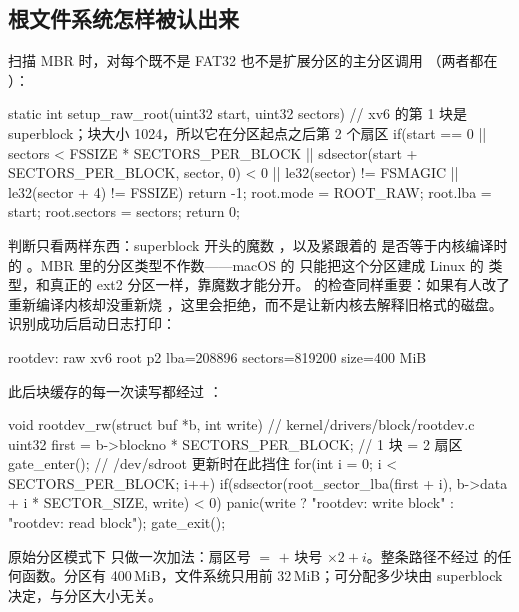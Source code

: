 \subsection{根文件系统怎样被认出来}

 扫描 MBR 时，对每个既不是 FAT32 也不是扩展分区的主分区调用 （两者都在 ）：

\begin{ccode}
static int setup_raw_root(uint32 start, uint32 sectors) {
  // xv6 的第 1 块是 superblock；块大小 1024，所以它在分区起点之后第 2 个扇区
  if(start == 0 || sectors < FSSIZE * SECTORS_PER_BLOCK ||
     sdsector(start + SECTORS_PER_BLOCK, sector, 0) < 0 ||
     le32(sector) != FSMAGIC || le32(sector + 4) != FSSIZE)
    return -1;
  root.mode = ROOT_RAW;
  root.lba = start;
  root.sectors = sectors;
  return 0;
}
\end{ccode}

判断只看两样东西：superblock 开头的魔数 ，以及紧跟着的  是否等于内核编译时的 。MBR 里的分区类型不作数——macOS 的  只能把这个分区建成 Linux 的  类型，和真正的 ext2 分区一样，靠魔数才能分开。 的检查同样重要：如果有人改了  重新编译内核却没重新烧 ，这里会拒绝，而不是让新内核去解释旧格式的磁盘。识别成功后启动日志打印：

\begin{txtcode}
rootdev: raw xv6 root p2 lba=208896 sectors=819200 size=400 MiB
\end{txtcode}

此后块缓存的每一次读写都经过 ：

\begin{ccode}
void rootdev_rw(struct buf *b, int write) {         // kernel/drivers/block/rootdev.c
  uint32 first = b->blockno * SECTORS_PER_BLOCK;    // 1 块 = 2 扇区
  gate_enter();                                     // /dev/sdroot 更新时在此挡住
  for(int i = 0; i < SECTORS_PER_BLOCK; i++)
    if(sdsector(root_sector_lba(first + i),
                b->data + i * SECTOR_SIZE, write) < 0)
      panic(write ? "rootdev: write block" : "rootdev: read block");
  gate_exit();
}
\end{ccode}

原始分区模式下  只做一次加法：扇区号 $=$  $+$ 块号 $\times 2 + i$。整条路径不经过  的任何函数。分区有 400\,MiB，文件系统只用前 32\,MiB；可分配多少块由 superblock 决定，与分区大小无关。

